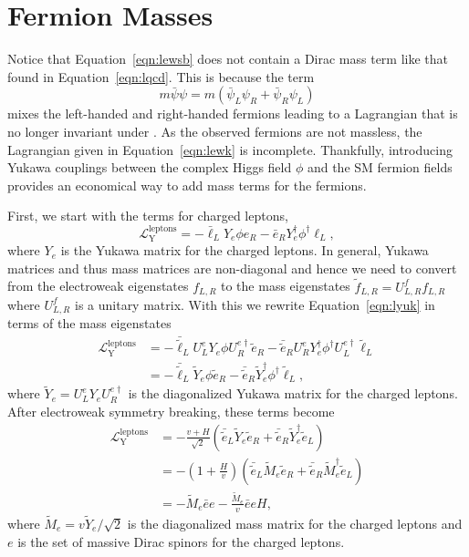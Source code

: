\section{Fermion Masses}
\label{sec:yukawa}

Notice that Equation~\ref{eqn:lewsb} does not contain a Dirac mass term like that found in Equation~\ref{eqn:lqcd}.
This is because the term
\begin{equation}
  m \bar \psi \psi = m \left( \bar \psi_L \psi_R + \bar \psi_R \psi_L \right)
\end{equation}
mixes the left-handed and right-handed fermions leading to a Lagrangian that is no longer invariant under \sutwo.
As the observed fermions are not massless, the Lagrangian given in Equation~\ref{eqn:lewk} is incomplete.
Thankfully, introducing Yukawa couplings between the complex Higgs field $\phi$ and the SM fermion fields provides an economical way to add mass terms for the fermions.

First, we start with the terms for charged leptons,
\begin{equation}
  \label{eqn:lyuk}
  \mathcal{L}^{\text{leptons}}_{\text{Y}} = - \bar \ell_L Y_e \phi e_R - \bar e_R Y_e^\dagger \phi^\dagger \ell_L,
\end{equation}
where $Y_e$ is the Yukawa matrix for the charged leptons.
In general, Yukawa matrices and thus mass matrices are non-diagonal and hence we need to convert from the electroweak eigenstates $f_{L,R}$ to the mass eigenstates $\tilde{f}_{L,R} = U^{f}_{L,R} f_{L,R}$ where $U^{f}_{L,R}$ is a unitary matrix.
With this we rewrite Equation~\ref{eqn:lyuk} in terms of the mass eigenstates
\begin{align}
  \mathcal{L}^{\text{leptons}}_{\text{Y}} & = - \bar{\tilde{\ell}}_{L} U^e_L Y_e \phi U^{e\dagger}_R \tilde{e}_{R} - \bar{\tilde{e}}_{R} U^e_R Y_e^\dagger \phi^\dagger U^{e\dagger}_L \tilde{\ell}_{L} \nonumber \\
  & = - \bar{\tilde{\ell}}_{L} \tilde Y_e \phi \tilde{e}_{R} - \bar{\tilde{e}}_{R} \tilde Y_e^\dagger \phi^\dagger \tilde{\ell}_{L}, 
\end{align}
where $\tilde Y_e = U^e_L Y_e U^{e\dagger}_R$ is the diagonalized Yukawa matrix for the charged leptons.
After electroweak symmetry breaking, these terms become
\begin{align}
  \mathcal{L}^{\text{leptons}}_{\text{Y}} & = - \frac{v + H}{\sqrt{2}} \left( \bar{\tilde{e}}_L \tilde Y_e  \tilde{e}_R + \bar{\tilde{e}}_R \tilde Y_e^\dagger \tilde{e}_L \right) \nonumber \\
  & = - \left(1 + \frac{H}{v}\right) \left( \bar{\tilde{e}}_L \tilde M_e \tilde{e}_R + \bar{\tilde{e}}_R \tilde M_e^\dagger \tilde{e}_L \right) \nonumber \\
  & = - \tilde M_e \bar e e - \frac{\tilde M_e}{v} \bar e e H,
    \label{eqn:lmass}
\end{align}
where $\tilde M_e = v \tilde Y_e / \sqrt{2}$ is the diagonalized mass matrix for the charged leptons and $e$ is the set of massive Dirac spinors for the charged leptons.

